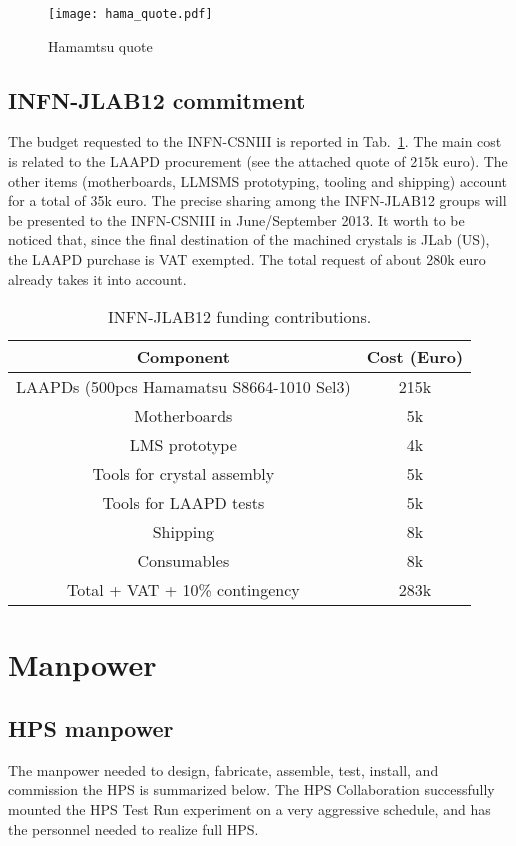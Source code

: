 \documentclass[11pt]{report}
\begin{document}
\begin{figure*}[t]
\begin{center}
\texttt{[image: hama\_quote.pdf]}
\caption{\small{Hamamtsu quote }}\label{fig:hama_quote}
\end{center}
\end{figure*}

\subsection{INFN-JLAB12 commitment}
The budget requested to the INFN-CSNIII is reported in Tab.~\ref{tb:infn_funds}. The main cost  is related to the LAAPD procurement (see the attached quote of 215k euro). The other items (motherboards, LLMSMS prototyping, tooling and shipping) 
account for a total of 35k euro. The precise  sharing among the INFN-JLAB12 groups will be presented to the INFN-CSNIII in June/September 2013. 
 It worth to be noticed that, since the final destination of the machined crystals is JLab (US), the LAAPD purchase is VAT exempted.
The total request of about 280k euro already takes it into account.


\begin{table}[htdp]
\caption{INFN-JLAB12 funding contributions.}
\begin{center}
\begin{tabular}{|c|c|}
\hline
Component& Cost (Euro) \\
\hline\hline
LAAPDs (500pcs Hamamatsu S8664-1010 Sel3) & 215k \\
\hline 
Motherboards & 5k \\
\hline
LMS prototype & 4k \\
\hline
Tools for crystal assembly & 5k \\
\hline
Tools for LAAPD tests & 5k \\
\hline
Shipping & 8k \\
\hline
Consumables & 8k \\
\hline
\hline
Total + VAT + 10\% contingency & 283k\\
\hline
\end{tabular}
\end{center}
\label{tb:infn_funds}
\end{table}%
\section{Manpower}
\subsection{HPS manpower}
The manpower needed to design, fabricate, assemble, test, install, and commission the HPS is summarized below.
The HPS Collaboration successfully mounted the HPS Test Run experiment on a very aggressive schedule, and has the personnel needed to realize full HPS.
\end{document}
